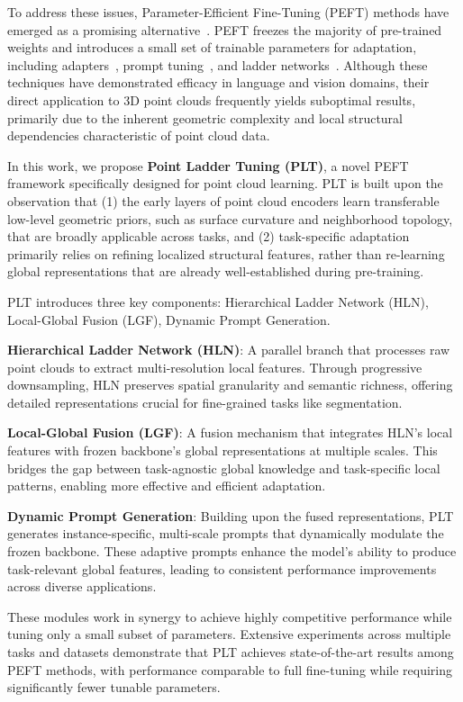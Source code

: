 To address these issues, Parameter-Efficient Fine-Tuning (PEFT) methods have emerged as a promising alternative~\cite{houlsby2019parameter, jie2023fact, karimi2021compacter}. PEFT freezes the majority of pre-trained weights and introduces a small set of trainable parameters for adaptation, including adapters~\cite{houlsby2019parameter}, prompt tuning~\cite{li2021prefix}, and ladder networks~\cite{sung2022lst}. Although these techniques have demonstrated efficacy in language and vision domains, their direct application to 3D point clouds frequently yields suboptimal results, primarily due to the inherent geometric complexity and local structural dependencies characteristic of point cloud data.

In this work, we propose \textbf{Point Ladder Tuning (PLT)}, a novel PEFT framework specifically designed for point cloud learning. PLT is built upon the observation that (1) the early layers of point cloud encoders learn transferable low-level geometric priors, such as surface curvature and neighborhood topology, that are broadly applicable across tasks, and (2) task-specific adaptation primarily relies on refining localized structural features, rather than re-learning global representations that are already well-established during pre-training.

PLT introduces three key components: Hierarchical Ladder Network (HLN), Local-Global Fusion (LGF), Dynamic Prompt Generation.

\textbf{Hierarchical Ladder Network (HLN)}: A parallel branch that processes raw point clouds to extract multi-resolution local features. Through progressive downsampling, HLN preserves spatial granularity and semantic richness, offering detailed representations crucial for fine-grained tasks like segmentation.

\textbf{Local-Global Fusion (LGF)}: A fusion mechanism that integrates HLN's local features with frozen backbone's global representations at multiple scales. This bridges the gap between task-agnostic global knowledge and task-specific local patterns, enabling more effective and efficient adaptation.

\textbf{Dynamic Prompt Generation}: Building upon the fused representations, PLT generates instance-specific, multi-scale prompts that dynamically modulate the frozen backbone. These adaptive prompts enhance the model's ability to produce task-relevant global features, leading to consistent performance improvements across diverse applications.

These modules work in synergy to achieve highly competitive performance while tuning only a small subset of parameters. Extensive experiments across multiple tasks and datasets demonstrate that PLT achieves state-of-the-art results among PEFT methods, with performance comparable to full fine-tuning while requiring significantly fewer tunable parameters.

